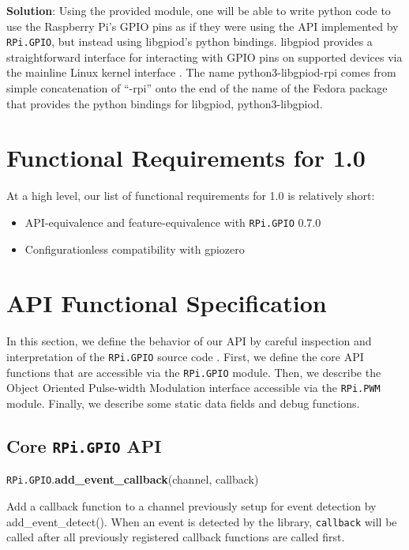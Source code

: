 \documentclass[12pt]{article}
\begin{document}
\textbf{Solution}:
Using the provided module, one will be able to write python code to use the Raspberry Pi's GPIO pins as if they were using the API implemented by \texttt{RPi.GPIO}, but instead using libgpiod's python bindings. libgpiod provides a straightforward interface for interacting with GPIO pins on supported devices via the mainline Linux kernel interface \cite{libgpiod}. The name python3-libgpiod-rpi comes from simple concatenation of ``-rpi'' onto the end of the name of the Fedora package that provides the python bindings for libgpiod, python3-libgpiod.



\section{Functional Requirements for 1.0}

At a high level, our list of functional requirements for 1.0 is relatively short:
\begin{itemize}
    \item API-equivalence and feature-equivalence with \texttt{RPi.GPIO} 0.7.0
    \item Configurationless compatibility with gpiozero \cite{gpiozero}
\end{itemize}

\section{API Functional Specification}

In this section, we define the behavior of our API by careful inspection and interpretation of the \texttt{RPi.GPIO} source code \cite{rpigpio}.
First, we define the core API functions that are accessible via the \texttt{RPi.GPIO} module.
Then, we describe the Object Oriented Pulse-width Modulation interface accessible via the \texttt{RPi.PWM} module. Finally, we describe some static data fields and debug functions.

\subsection{Core \texttt{RPi.GPIO} API} \label{coreapi}
 
\texttt{RPi.GPIO}.\textbf{add\_event\_callback}(channel, callback)



Add a callback function to a channel previously setup for event detection by add\_event\_detect(). When an event is detected by the library, \texttt{callback} will be called after all previously registered callback functions are called first.
\end{document}
